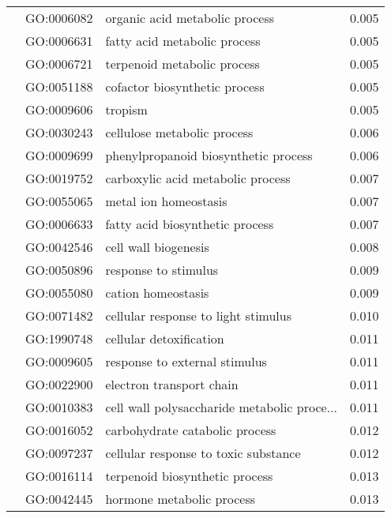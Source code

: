 \begin{longtable}{lllr}
   & GO:0006082 &               organic acid metabolic process &         0.005 \\
   & GO:0006631 &                 fatty acid metabolic process &         0.005 \\
   & GO:0006721 &                  terpenoid metabolic process &         0.005 \\
   & GO:0051188 &                cofactor biosynthetic process &         0.005 \\
   & GO:0009606 &                                      tropism &         0.005 \\
   & GO:0030243 &                  cellulose metabolic process &         0.006 \\
   & GO:0009699 &         phenylpropanoid biosynthetic process &         0.006 \\
   & GO:0019752 &            carboxylic acid metabolic process &         0.007 \\
   & GO:0055065 &                        metal ion homeostasis &         0.007 \\
   & GO:0006633 &              fatty acid biosynthetic process &         0.007 \\
   & GO:0042546 &                         cell wall biogenesis &         0.008 \\
   & GO:0050896 &                         response to stimulus &         0.009 \\
   & GO:0055080 &                           cation homeostasis &         0.009 \\
   & GO:0071482 &          cellular response to light stimulus &         0.010 \\
   & GO:1990748 &                      cellular detoxification &         0.011 \\
   & GO:0009605 &                response to external stimulus &         0.011 \\
   & GO:0022900 &                     electron transport chain &         0.011 \\
   & GO:0010383 &  cell wall polysaccharide metabolic proce... &         0.011 \\
   & GO:0016052 &               carbohydrate catabolic process &         0.012 \\
   & GO:0097237 &         cellular response to toxic substance &         0.012 \\
   & GO:0016114 &               terpenoid biosynthetic process &         0.013 \\
   & GO:0042445 &                    hormone metabolic process &         0.013 \\

\end{longtable}
